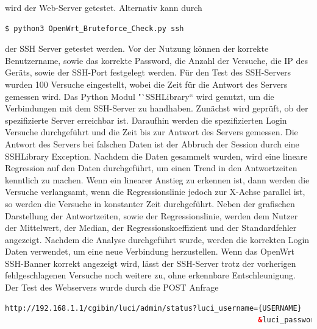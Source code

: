 \documentclass[a4paper]{book}
\begin{document}
\begin{large}
\begin{onehalfspace}
\noindent wird der Web-Server getestet. Alternativ kann durch \\

\begin{lstlisting}[language=sh,caption={OpenWrt SSH-Server mit Python Skript auf Resistenz gegen Bruteforce Angriffe testen.}]
$ python3 OpenWrt_Bruteforce_Check.py ssh
\end{lstlisting}

\noindent der SSH Server getestet werden. Vor der Nutzung können der korrekte Benutzername, sowie das korrekte Password, die Anzahl der Versuche, die IP des Geräts, sowie der SSH-Port festgelegt werden. Für den Test des SSH-Servers wurden 100 Versuche eingestellt, wobei die Zeit für die Antwort des Servers gemessen wird. Das Python Modul "`SSHLibrary“ wird genutzt, um die Verbindungen mit dem SSH-Server zu handhaben. Zunächst wird geprüft, ob der spezifizierte Server erreichbar ist. Daraufhin werden die spezifizierten Login Versuche durchgeführt und die Zeit bis zur Antwort des Servers gemessen. Die Antwort des Servers bei falschen Daten ist der Abbruch der Session durch eine SSHLibrary Exception. Nachdem die Daten gesammelt wurden, wird eine lineare Regression auf den Daten durchgeführt, um einen Trend in den Antwortzeiten kenntlich zu machen. Wenn ein linearer Anstieg zu erkennen ist, dann werden die Versuche verlangsamt, wenn die Regressionslinie jedoch zur X-Achse parallel ist, so werden die Versuche in konstanter Zeit durchgeführt. Neben der grafischen Darstellung der Antwortzeiten, sowie der Regressionslinie, werden dem Nutzer der Mittelwert, der Median, der Regressionskoeffizient und der Standardfehler angezeigt. Nachdem die Analyse durchgeführt wurde, werden die korrekten Login Daten verwendet, um eine neue Verbindung herzustellen. Wenn das OpenWrt SSH-Banner korrekt angezeigt wird, lässt der SSH-Server trotz der vorherigen fehlgeschlagenen Versuche noch weitere zu, ohne erkennbare Entschleunigung. Der Test des Webservers wurde durch die POST Anfrage \vfill \pagebreak

\begin{lstlisting}[language=html]
http://192.168.1.1/cgibin/luci/admin/status?luci_username={USERNAME}
                                                          &luci_password={PASSWORD}
\end{lstlisting}



\end{onehalfspace}
\end{large}
\end{document}
